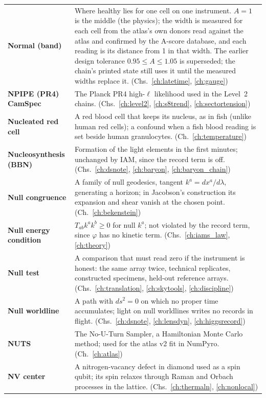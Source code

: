 {\begin{longtable}{@{}>{\raggedright\arraybackslash}p{}>{\raggedright\arraybackslash}p{}@{}}
\textbf{Normal (band)} & Where healthy lies for one cell on one instrument. $A=1$ is the middle (the physics); the width is measured for each cell from the atlas's own donors read against the atlas and confirmed by the A-score database, and each reading is its distance from 1 in that width. The earlier design tolerance $0.95\le A\le1.05$ is superseded; the chain's printed state still uses it until the measured widths replace it. {\footnotesize(Chs.~\ref{ch:latetime}, \ref{ch:gauge})}\\[1pt]
\textbf{NPIPE (PR4) CamSpec} & The Planck PR4 high-$\ell$ likelihood used in the Level~2 chains. {\footnotesize(Chs.~\ref{ch:level2}, \ref{ch:s8trend}, \ref{ch:sectortension})}\\[1pt]
\textbf{Nucleated red cell} & A red blood cell that keeps its nucleus, as in fish (unlike human red cells); a confound when a fish blood reading is set beside human granulocytes. {\footnotesize(Ch.~\ref{ch:temperature})}\\[1pt]
\textbf{Nucleosynthesis (BBN)} & Formation of the light elements in the first minutes; unchanged by IAM, since the record term is off. {\footnotesize(Chs.~\ref{ch:dsnote}, \ref{ch:baryon}, \ref{ch:baryon_chain})}\\[1pt]
\textbf{Null congruence} & A family of null geodesics, tangent $k^a=dx^a/d\lambda$, generating a horizon; in Jacobson's construction its expansion and shear vanish at the chosen point. {\footnotesize(Ch.~\ref{ch:bekenstein})}\\[1pt]
\textbf{Null energy condition} & $T_{ab}k^ak^b\ge0$ for null $k^a$; not violated by the record term, since $\varphi$ has no kinetic term. {\footnotesize(Chs.~\ref{ch:iams_law}, \ref{ch:theory})}\\[1pt]
\textbf{Null test} & A comparison that must read zero if the instrument is honest: the same array twice, technical replicates, constructed specimens, held-out reference arrays. {\footnotesize(Chs.~\ref{ch:translation}, \ref{ch:skytools}, \ref{ch:discipline})}\\[1pt]
\textbf{Null worldline} & A path with $ds^2=0$ on which no proper time accumulates; light on null worldlines writes no records in flight. {\footnotesize(Chs.~\ref{ch:dsnote}, \ref{ch:lensdyn}, \ref{ch:higgsrecord})}\\[1pt]
\textbf{NUTS} & The No-U-Turn Sampler, a Hamiltonian Monte Carlo method; used for the atlas v2 fit in NumPyro. {\footnotesize(Ch.~\ref{ch:atlas})}\\[1pt]
\textbf{NV center} & A nitrogen-vacancy defect in diamond used as a spin qubit; its spin relaxes through Raman and Orbach processes in the lattice. {\footnotesize(Chs.~\ref{ch:thermaln}, \ref{ch:nonlocal})}\\[1pt]

\end{longtable}}
